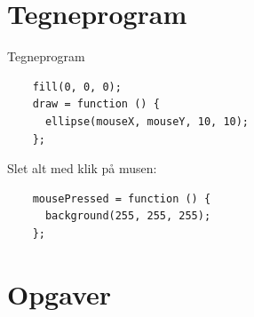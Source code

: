 \documentclass[oneside,a4paper,10pts,article]{memoir}
\begin{document}
\newpage
\chapter{Tegneprogram}

\noindent
Tegneprogram
\begin{lstlisting}
    fill(0, 0, 0);
    draw = function () {
      ellipse(mouseX, mouseY, 10, 10);
    };
\end{lstlisting}

\noindent
Slet alt med klik på musen:
\begin{lstlisting}
    mousePressed = function () {
      background(255, 255, 255);
    };
\end{lstlisting}

\chapter{Opgaver}
\end{document}
